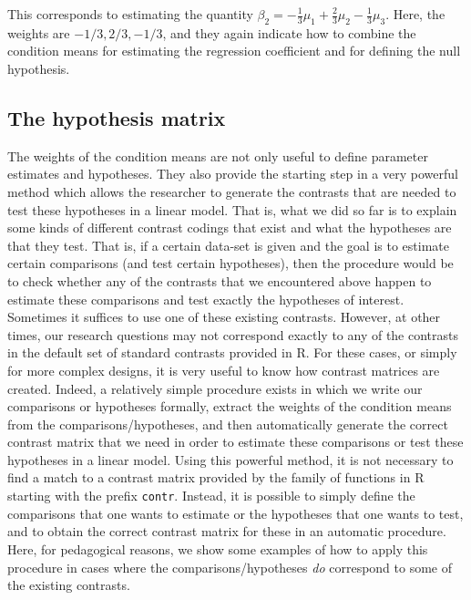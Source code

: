 \documentclass[
  12pt,
]{krantz}
\theoremstyle{definition}
\theoremstyle{definition}
\theoremstyle{definition}
\theoremstyle{definition}
\theoremstyle{remark}
\begin{document}
\noindent
This corresponds to estimating the quantity \(\beta_2 = -\frac{1}{3}\mu_1 + \frac{2}{3} \mu_2 - \frac{1}{3} \mu_3\).
Here, the weights are \(-1/3, 2/3, -1/3\), and they again indicate how to combine the condition means for estimating the regression coefficient and for defining the null hypothesis.

\hypertarget{the-hypothesis-matrix}{%
\subsection{The hypothesis matrix}\label{the-hypothesis-matrix}}

The weights of the condition means are not only useful to define parameter estimates and hypotheses. They also provide the starting step in a very powerful method which allows the researcher to generate the contrasts that are needed to test these hypotheses in a linear model. That is, what we did so far is to explain some kinds of different contrast codings that exist and what the hypotheses are that they test. That is, if a certain data-set is given and the goal is to estimate certain comparisons (and test certain hypotheses), then the procedure would be to check whether any of the contrasts that we encountered above happen to estimate these comparisons and test exactly the hypotheses of interest. Sometimes it suffices to use one of these existing contrasts. However, at other times, our research questions may not correspond exactly to any of the contrasts in the default set of standard contrasts provided in R. For these cases, or simply for more complex designs, it is very useful to know how contrast matrices are created. Indeed, a relatively simple procedure exists in which we write our comparisons or hypotheses formally, extract the weights of the condition means from the comparisons/hypotheses, and then automatically generate the correct contrast matrix that we need in order to estimate these comparisons or test these hypotheses in a linear model. Using this powerful method, it is not necessary to find a match to a contrast matrix provided by the family of functions in R starting with the prefix \texttt{contr}. Instead, it is possible to simply define the comparisons that one wants to estimate or the hypotheses that one wants to test, and to obtain the correct contrast matrix for these in an automatic procedure. Here, for pedagogical reasons, we show some examples of how to apply this procedure in cases where the comparisons/hypotheses \emph{do} correspond to some of the existing contrasts.
\end{document}

